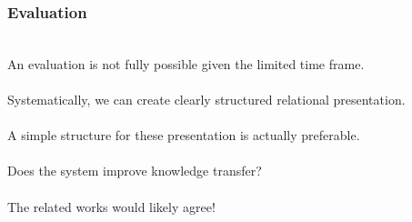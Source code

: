 
\begin{frame}
  \frametitle{Evaluation}
  \begin{module}[id=evaluation]\\
\noindent
An evaluation is not fully possible given the limited time frame.\\
\\
\noindent
Systematically, we can create clearly structured relational presentation.\\
\\
\noindent
A simple structure for these presentation is actually preferable.\\
\\
\noindent
Does the system improve knowledge transfer?\\
\\
\noindent
The related works would likely agree!\\



  \end{module}
\end{frame}